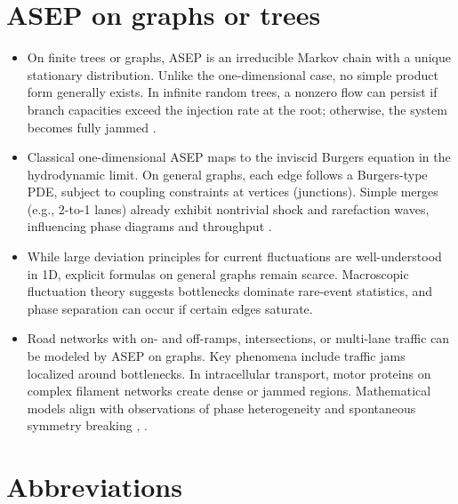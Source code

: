 \documentclass{article}
\theoremstyle{definition}
\begin{document}
\section{ASEP on graphs or trees}

\begin{itemize}
        \item On finite trees or graphs, ASEP is an irreducible Markov chain with a unique stationary distribution. Unlike the one-dimensional case, no simple product form generally exists.
        In infinite random trees, a nonzero flow can persist if branch capacities exceed the injection rate at the root; otherwise, the system becomes fully jammed \cite{Gantert2021}.

        \item Classical one-dimensional ASEP maps to the inviscid Burgers equation in the hydrodynamic limit. On general graphs, each edge follows a Burgers-type PDE, subject to coupling constraints at vertices (junctions).
        Simple merges (e.g., 2-to-1 lanes) already exhibit nontrivial shock and rarefaction waves, influencing phase diagrams and throughput \cite{Zhang2019}.

        \item While large deviation principles for current fluctuations are well-understood in 1D, explicit formulas on general graphs remain scarce.
        Macroscopic fluctuation theory suggests bottlenecks dominate rare-event statistics, and phase separation can occur if certain edges saturate.

        \item Road networks with on- and off-ramps, intersections, or multi-lane traffic can be modeled by ASEP on graphs. Key phenomena include traffic jams localized around bottlenecks.
				In intracellular transport, motor proteins on complex filament networks create dense or jammed regions. Mathematical models align with observations of phase heterogeneity and spontaneous symmetry breaking \cite{Neri2013}, \cite{AppertRolland2015}.
\end{itemize}


\appendix
\section{Abbreviations}
\end{document}
